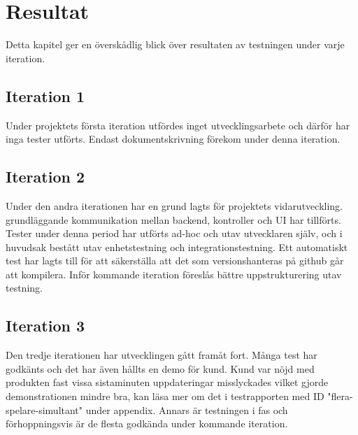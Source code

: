 \documentclass[10pt]{article}
\begin{document}
\section{Resultat}
Detta kapitel ger en överskådlig blick över resultaten av testningen under varje iteration.

\subsection{Iteration 1}
Under projektets första iteration utfördes inget utvecklingsarbete och därför har inga tester utförts. Endast dokumentskrivning förekom under denna iteration.
\subsection{Iteration 2}
Under den andra iterationen har en grund lagts för projektets vidarutveckling. grundläggande kommunikation mellan backend, kontroller och UI har tillförts. Tester under denna period har utförts ad-hoc och utav utvecklaren själv, och i huvudsak bestått utav enhetstestning och integrationstestning. Ett automatiskt test har lagts till för att säkerställa att det som versionshanteras på github går att kompilera. Inför kommande iteration föreslås bättre uppstrukturering utav testning.
\subsection{Iteration 3}
Den tredje iterationen har utvecklingen gått framåt fort. Många test har godkänts och det har även hållts en demo för kund. Kund var nöjd med produkten fast vissa sistaminuten uppdateringar misslyckades vilket gjorde demonstrationen mindre bra, kan läsa mer om det i testrapporten med ID "flera-spelare-simultant" under appendix. Annars är testningen i fas och förhoppningsvis är de flesta godkända under kommande iteration.
\end{document}
